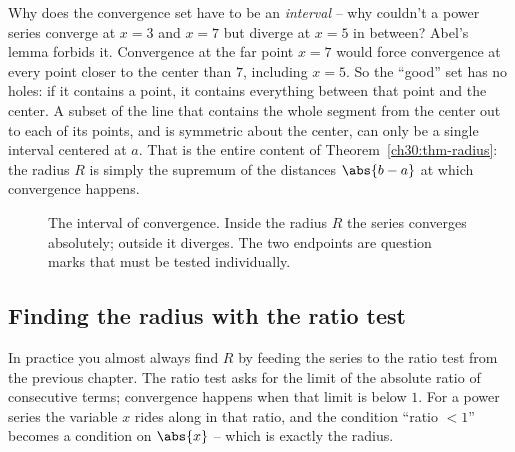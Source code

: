 \begin{whybox}
Why does the convergence set have to be an \emph{interval} -- why couldn't a power series converge at $x=3$ and $x=7$ but diverge at $x=5$ in between? Abel's lemma forbids it. Convergence at the far point $x=7$ would force convergence at every point closer to the center than $7$, including $x=5$. So the ``good'' set has no holes: if it contains a point, it contains everything between that point and the center. A subset of the line that contains the whole segment from the center out to each of its points, and is symmetric about the center, can only be a single interval centered at $a$. That is the entire content of Theorem~\ref{ch30:thm-radius}: the radius $R$ is simply the supremum of the distances $\abs{b-a}$ at which convergence happens.
\end{whybox}

\begin{figure}[H]
\centering
{}
\caption{The interval of convergence. Inside the radius $R$ the series converges absolutely; outside it diverges. The two endpoints are question marks that must be tested individually.}
\label{ch30:fig-interval}
\end{figure}

\subsection{Finding the radius with the ratio test}

In practice you almost always find $R$ by feeding the series to the ratio test from the previous chapter. The ratio test asks for the limit of the absolute ratio of consecutive terms; convergence happens when that limit is below $1$. For a power series the variable $x$ rides along in that ratio, and the condition ``ratio $< 1$'' becomes a condition on $\abs{x}$ -- which is exactly the radius.

